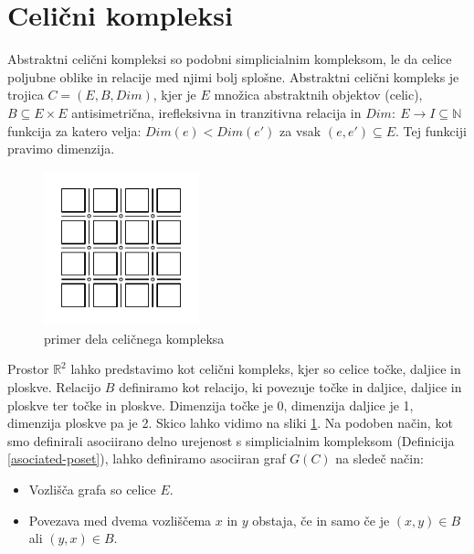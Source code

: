 \documentclass[a4paper, 12pt]{book}
\theoremstyle{definition}
\theoremstyle{remark}
\begin{document}
\section{Celični kompleksi} \label{celicni-kompleksi}
Abstraktni celični kompleksi so podobni simplicialnim kompleksom, le da
celice poljubne oblike in relacije med njimi bolj splošne. Abstraktni celični kompleks
je trojica $C = (E,B,Dim)$, kjer je $E$ množica abstraktnih objektov (celic), $B \subseteq E \times E$ antisimetrična,
irefleksivna in tranzitivna relacija in $Dim:\ E \rightarrow I\subseteq\mathbb{N}$ funkcija
za katero velja: $Dim(e) < Dim(e')$ za vsak $(e,e') \subseteq E$. Tej funkciji pravimo
dimenzija.
\begin{figure}
  \begin{center}
  \includegraphics[width=0.4\textwidth]{r2-cell.pdf}
  \end{center}
  \caption{primer dela celičnega kompleksa}
  \label{celicni}
\end{figure}
Prostor $\mathbb{R}^2$ lahko predstavimo kot celični kompleks, kjer so celice
točke, daljice in ploskve. Relacijo $B$ definiramo kot relacijo, ki povezuje
točke in daljice, daljice in ploskve ter točke in ploskve. Dimenzija točke je 0,
dimenzija daljice je 1, dimenzija ploskve pa je 2. Skico lahko vidimo na sliki
\ref{celicni}.
Na podoben način, kot smo definirali asociirano delno urejenost s simplicialnim
kompleksom (Definicija \ref{asociated-poset}), lahko definiramo asociiran graf
$G(C)$ na sledeč način:
\begin{itemize}
  \item Vozlišča grafa so celice $E$.
  \item Povezava med dvema vozliščema $x$ in $y$ obstaja, če in samo če je
  $(x,y) \in B$ ali $(y,x) \in B$.
\end{itemize}
\end{document}
